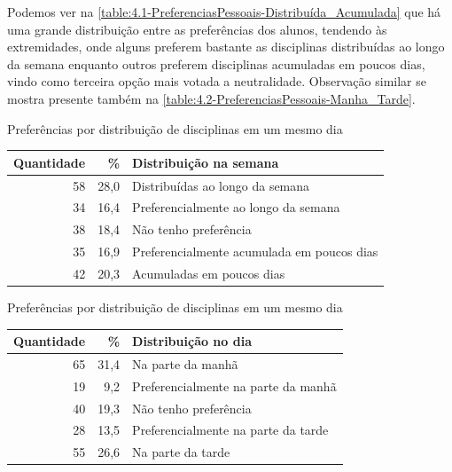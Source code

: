 \begin{apendicesenv}
  Podemos ver na \autoref{table:4.1-PreferenciasPessoais-Distribuída_Acumulada} que há uma grande distribuição entre as preferências dos alunos, tendendo às extremidades, onde alguns preferem bastante as disciplinas distribuídas ao longo da semana enquanto outros preferem disciplinas acumuladas em poucos dias, vindo como terceira opção mais votada a neutralidade. Observação similar se mostra presente também na \autoref{table:4.2-PreferenciasPessoais-Manha_Tarde}.

  \begin{CenteredTable} \caption{Preferências por distribuição de disciplinas em um mesmo dia} \label{table:4.1-PreferenciasPessoais-Distribuída_Acumulada}
    \begin{tabular}{| r r l |}
      \hline
      \textbf{Quantidade} & \%   & \textbf{Distribuição na semana}            \\
      \hline
      58                  & 28,0 & Distribuídas ao longo da semana            \\
      34                  & 16,4 & Preferencialmente ao longo da semana       \\
      38                  & 18,4 & Não tenho preferência                      \\
      35                  & 16,9 & Preferencialmente acumulada em poucos dias \\
      42                  & 20,3 & Acumuladas em poucos dias                  \\
      \hline
    \end{tabular}
  \end{CenteredTable}

  \begin{CenteredTable} \caption{Preferências por distribuição de disciplinas em um mesmo dia} \label{table:4.2-PreferenciasPessoais-Manha_Tarde}
    \begin{tabular}{| r r l |}
      \hline
      \textbf{Quantidade} & \%   & \textbf{Distribuição no dia}        \\
      \hline
      65                  & 31,4 & Na parte da manhã                   \\
      19                  & 9,2  & Preferencialmente na parte da manhã \\
      40                  & 19,3 & Não tenho preferência               \\
      28                  & 13,5 & Preferencialmente na parte da tarde \\
      55                  & 26,6 & Na parte da tarde                   \\
      \hline
    \end{tabular}
  \end{CenteredTable}


\end{apendicesenv}
